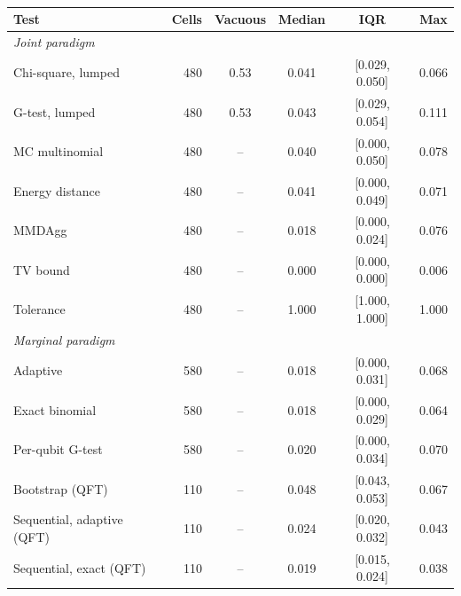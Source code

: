 \begin{table}[ht]
\centering
\caption{}
\label{tab:baseline_typei}
\footnotesize
\setlength{\tabcolsep}{4pt}
\begin{tabular}{@{}l r c c c c@{}}
\toprule
Test & Cells & Vacuous & Median & IQR & Max \\
\midrule
\multicolumn{6}{l}{\emph{Joint paradigm}} \\
Chi-square, lumped & 480 & 0.53 & 0.041 & [0.029, 0.050] & 0.066 \\
G-test, lumped & 480 & 0.53 & 0.043 & [0.029, 0.054] & 0.111 \\
MC multinomial & 480 & -- & 0.040 & [0.000, 0.050] & 0.078 \\
Energy distance & 480 & -- & 0.041 & [0.000, 0.049] & 0.071 \\
MMDAgg & 480 & -- & 0.018 & [0.000, 0.024] & 0.076 \\
TV bound & 480 & -- & 0.000 & [0.000, 0.000] & 0.006 \\
Tolerance & 480 & -- & 1.000 & [1.000, 1.000] & 1.000 \\
\multicolumn{6}{l}{\emph{Marginal paradigm}} \\
Adaptive & 580 & -- & 0.018 & [0.000, 0.031] & 0.068 \\
Exact binomial & 580 & -- & 0.018 & [0.000, 0.029] & 0.064 \\
Per-qubit G-test & 580 & -- & 0.020 & [0.000, 0.034] & 0.070 \\
Bootstrap (QFT) & 110 & -- & 0.048 & [0.043, 0.053] & 0.067 \\
Sequential, adaptive (QFT) & 110 & -- & 0.024 & [0.020, 0.032] & 0.043 \\
Sequential, exact (QFT) & 110 & -- & 0.019 & [0.015, 0.024] & 0.038 \\
\bottomrule
\end{tabular}
\end{table}
